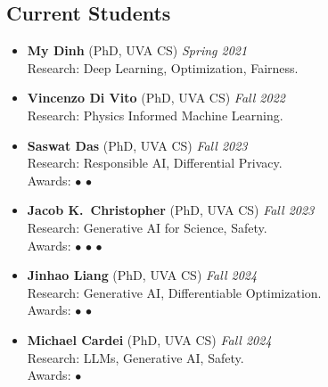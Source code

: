 \medskip

\subsection*{Current Students}
\begin{itemize}

  \item \textbf{My Dinh} (PhD, {\sc UVA} CS) 
  \hfill{\em Spring 2021}\\
  {\sc Research}: Deep Learning, Optimization, Fairness.

  \item \textbf{Vincenzo Di Vito} (PhD, {\sc UVA} CS)
  \hfill{\em Fall 2022}\\
  {\sc Research:} Physics Informed Machine Learning.
  
  \item \textbf{Saswat Das} (PhD, {\sc UVA} CS)
  \hfill{\em Fall 2023}\\
  {\sc Research:} Responsible AI, Differential Privacy.\\
  {\sc Awards:} 
  $\bullet$ 
  $\bullet$ 

  \item \textbf{Jacob K.~Christopher} (PhD, {\sc UVA} CS)
  \hfill{\em Fall 2023}\\
  {\sc Research:} Generative AI for Science, Safety.\\
  {\sc Awards:} 
  $\bullet$  
  $\bullet$ 
  $\bullet$ 

  \item \textbf{Jinhao Liang} (PhD, {\sc UVA} CS)
  \hfill{\em Fall 2024}\\
  {\sc Research:} Generative AI, Differentiable Optimization.\\
  {\sc Awards:} 
  $\bullet$ 
  $\bullet$ 
  
  \item \textbf{Michael Cardei} (PhD, {\sc UVA} CS)
  \hfill{\em Fall 2024}\\
  {\sc Research:} LLMs, Generative AI, Safety.\\
  {\sc Awards:} $\bullet$ 

\end{itemize}

